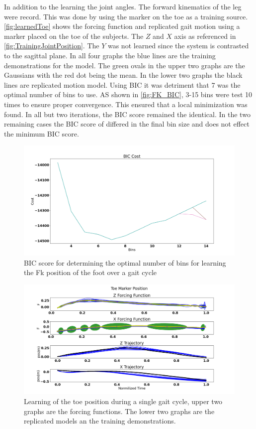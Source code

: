 In addition to the learning the joint angles. The forward kinematics of the leg were record. This was done by using the marker on the toe as a training source. \autoref{fig:learnedToe} shows the forcing function and replicated gait motion using a marker placed on the toe of the subjects. The $Z$ and $X$ axis as referenced in \autoref{fig:TrainingJointPosition}. The $Y$ was not learned since the system is contrasted to the sagittal plane. In all four graphs the blue lines are the training demonstrations for the model. The green ovals in the upper two graphs are the Gaussians with the red dot being the mean. In the lower two graphs the black lines are replicated motion model. Using BIC it was detriment that 7 was the optimal number of bins to use. AS shown in \autoref{fig:FK_BIC}, 3-15 bins were test 10 times to ensure proper convergence. This ensured that a local minimization was found. In all but two iterations, the BIC score remained the identical. In the two remaining cases the BIC score of differed in the final bin size and does not effect the minimum BIC score.


\begin{figure}
    \centering
    \includegraphics[scale=0.25]{images/gait_data/BIC_FK.png}
    \caption[FK BIC score]{BIC score for determining the optimal number of bins for learning the Fk position of the foot over a gait cycle}
    \label{fig:FK_BIC}
\end{figure}


\begin{figure}[!htb]
    \centering
    \includegraphics[scale=0.35]{images/gait_data/toe_maker_pos.png}
    \caption[Toe Marker Position]{Learning of the toe position during a single gait cycle, upper two graphs are the forcing functions. The lower two graphs are the replicated models an the training demonstrations.}
    \label{fig:learnedToe}
\end{figure}

